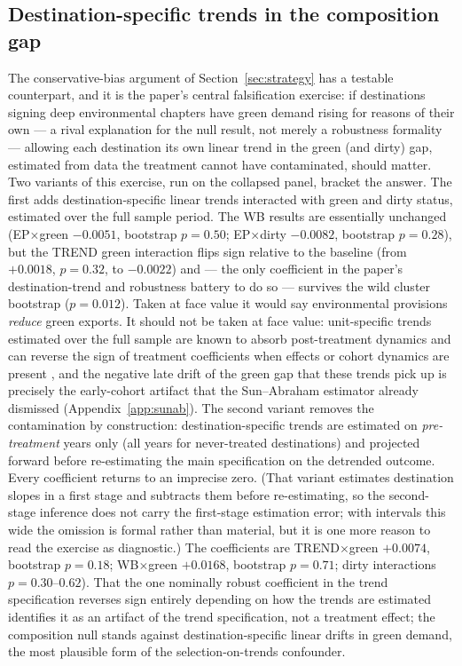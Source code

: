 \documentclass[12pt]{article}
\begin{document}
\subsection{Destination-specific trends in the composition gap}

The conservative-bias argument of Section~\ref{sec:strategy} has a testable
counterpart, and it is the paper's central falsification exercise: if destinations
signing deep environmental chapters have green demand rising for reasons of their own
--- a rival explanation for the null result, not merely a robustness formality ---
allowing each destination its own linear trend in the green (and dirty) gap, estimated
from data the treatment cannot have contaminated, should matter. Two variants of this exercise, run on the
collapsed panel, bracket the answer. The first adds destination-specific linear trends
interacted with green and dirty status, estimated over the full sample period. The WB
results are essentially unchanged (EP$\times$green $-0.0051$, bootstrap $p=0.50$;
EP$\times$dirty $-0.0082$, bootstrap $p=0.28$), but the TREND green interaction flips
sign relative to the baseline (from $+0.0018$, $p=0.32$, to $-0.0022$) and --- the only
coefficient in the paper's destination-trend and robustness battery to do so ---
survives the wild cluster bootstrap ($p=0.012$). Taken at face value it would say
environmental provisions \emph{reduce} green exports. It should not be taken at face
value: unit-specific trends estimated over the full sample are known to absorb
post-treatment dynamics and can reverse the sign of treatment coefficients when
effects or cohort dynamics are present \citep{wolfers2006}, and the negative late
drift of the green gap that these trends pick up is precisely the early-cohort
artifact that the Sun--Abraham estimator already dismissed
(Appendix~\ref{app:sunab}). The second variant removes the contamination by
construction: destination-specific trends are estimated on \emph{pre-treatment} years
only (all years for never-treated destinations) and projected forward before
re-estimating the main specification on the detrended outcome. Every coefficient
returns to an imprecise zero. (That variant estimates destination slopes in a first
stage and subtracts them before re-estimating, so the second-stage inference does not
carry the first-stage estimation error; with intervals this wide the omission is formal
rather than material, but it is one more reason to read the exercise as diagnostic.)
The coefficients are TREND$\times$green $+0.0074$, bootstrap $p=0.18$;
WB$\times$green $+0.0168$, bootstrap $p=0.71$; dirty interactions $p=0.30$--$0.62$).
That the one nominally robust coefficient in the trend specification reverses sign
entirely depending on how the trends are estimated identifies it as an artifact of the
trend specification, not a treatment effect; the composition null stands against
destination-specific linear drifts in green demand, the most plausible form of the
selection-on-trends confounder.
\end{document}
